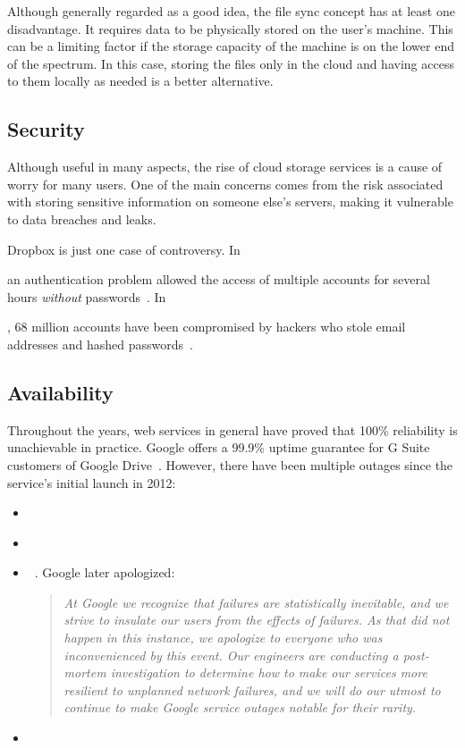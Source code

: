 Although generally regarded as a good idea, the file sync concept has at least one disadvantage. It requires data to be physically stored on the user's machine. This can be a limiting factor if the storage capacity of the machine is on the lower end of the spectrum. In this case, storing the files only in the cloud and having access to them locally as needed is a better alternative.

\subsection{Security}

Although useful in many aspects, the rise of cloud storage services is a cause of worry for many users. One of the main concerns comes from the risk associated with storing sensitive information on someone else's servers, making it vulnerable to data breaches and leaks.

Dropbox is just one case of controversy. In \date{June 2011} an authentication problem allowed the access of multiple accounts for several hours \emph{without} passwords~\cite{dropbox_security_bug_made_passwords_optional_for_four_hours}. In \date{August 2016}, 68 million accounts have been compromised by hackers who stole email addresses and hashed passwords~\cite{dropbox_hackers_stole_email_addresses}.

\subsection{Availability}

Throughout the years, web services in general have proved that 100\% reliability is unachievable in practice. Google offers a 99.9\% uptime guarantee for G Suite customers of Google Drive~\cite{google_drive_reliability}. However, there have been multiple outages since the service's initial launch in 2012:

\begin{itemize}
  \itemsep0em
  \item \date{March 2013}~\cite{google_drive_experiencing_outage}
  \item \date{October 2014}~\cite{google_drive_and_docs_down}
  \item \date{January 2016}~\cite{gmail_google_drive_down}. Google later apologized:
    \begin{quote}
      \emph{At Google we recognize that failures are statistically inevitable, and we strive to insulate our users from the effects of failures. As that did not happen in this instance, we apologize to everyone who was inconvenienced by this event. Our engineers are conducting a post-mortem investigation to determine how to make our services more resilient to unplanned network failures, and we will do our utmost to continue to make Google service outages notable for their rarity.}~\cite{google_outage_apology}
    \end{quote}
  \item \date{September 2017}~\cite{google_suffered_a_meltdown}
\end{itemize}

